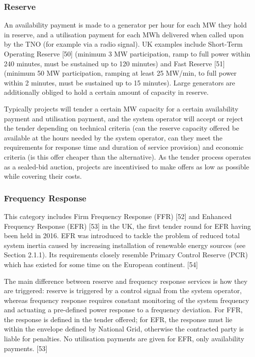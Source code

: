 \documentclass[report_18month.tex]{subfiles}
\begin{document}
\subsubsection{Reserve}
An availability payment is made to a generator per hour for each MW they hold in reserve, and a utilisation payment for each MWh delivered when called upon by the TNO (for example via a radio signal). UK examples include Short-Term Operating Reserve [50] (minimum 3 MW participation, ramp to full power within 240 minutes, must be sustained up to 120 minutes) and Fast Reserve [51] (minimum 50 MW participation, ramping at least 25 MW/min, to full power within 2 minutes, must be sustained up to 15 minutes). Large generators are additionally obliged to hold a certain amount of capacity in reserve.

Typically projects will tender a certain MW capacity for a certain availability payment and utilisation payment, and the system operator will accept or reject the tender depending on technical criteria (can the reserve capacity offered be available at the hours needed by the system operator, can they meet the requirements for response time and duration of service provision) and economic criteria (is this offer cheaper than the alternative). As the tender process operates as a sealed-bid auction, projects are incentivised to make offers as low as possible while covering their costs.

\subsubsection{Frequency Response}
This category includes Firm Frequency Response (FFR) [52] and Enhanced Frequency Response (EFR) [53] in the UK, the first tender round for EFR having been held in 2016. EFR was introduced to tackle the problem of reduced total system inertia caused by increasing installation of renewable energy sources (see Section 2.1.1). Its requirements closely resemble Primary Control Reserve (PCR) which has existed for some time on the European continent. [54]

The main difference between reserve and frequency response services is how they are triggered: reserve is triggered by a control signal from the system operator, whereas frequency response requires constant monitoring of the system frequency and actuating a pre-defined power response to a frequency deviation. For FFR, the response is defined in the tender offered; for EFR, the response must lie within the envelope defined by National Grid, otherwise the contracted party is liable for penalties. No utilisation payments are given for EFR, only availability payments. [53]
\end{document}
